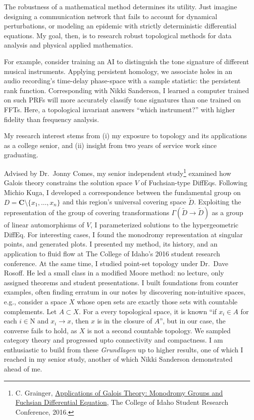 The robustness of a mathematical method determines its utility. Just
imagine designing a communication network that fails to account for
dynamical perturbations, or modeling an epidemic with strictly
deterministic differential equations. My goal, then, is to research
robust topological methods for data analysis and physical applied
mathematics.

For example, consider training an AI to distinguish the tone signature
of different musical instruments. Applying persistent homology, we
associate holes in an audio recording's time-delay phase-space with a
sample statistic: the persistent rank function. Corresponding with Nikki
Sanderson, I learned a computer trained on such PRFs will more
accurately classify tone signatures than one trained on FFTs. Here, a
topological invariant answers ``which instrument?'' with higher fidelity
than frequency analysis.

My research interest stems from (i) my exposure to topology and its
applications as a college senior, and (ii) insight from two years of
service work since graduating.

Advised by Dr.~Jonny Comes, my senior independent study\footnote{C.
  Grainger,
  \href{http://coltongrainger.com/documents/cgrainger_coursework_galois_poster.pdf}{Applications
  of Galois Theory: Monodromy Groups and Fuchsian Differential
  Equation}, The College of Idaho Student Research Conference, 2016.}
examined how Galois theory constrains the solution space \(V\) of
Fuchsian-type DiffEqs. Following Michio Kuga, I developed a
correspondence between the fundamental group on
\(D = \mathbf{C}\setminus\{x_1,\ldots,x_n\}\) and this region's
universal covering space \(\tilde{D}\). Exploiting the representation of
the group of covering transformations
\(\Gamma(\tilde{D} \to \tilde{D})\) as a group of linear automorphisms
of \(V\), I parameterized solutions to the hypergeometric DiffEq. For
interesting cases, I found the monodromy representation at singular
points, and generated plots. I presented my method, its history, and an
application to fluid flow at The College of Idaho's 2016 student
research conference. At the same time, I studied point-set topology
under Dr.~Dave Rosoff. He led a small class in a modified Moore method:
no lecture, only assigned theorems and student presentations. I built
foundations from counter examples, often finding erratum in our notes by
discovering non-intuitive spaces, e.g., consider a space \(X\) whose
open sets are exactly those sets with countable complements. Let
\(A \subset X\). For a every topological space, it is known ``if
\(x_i \in A\) for each \(i \in \mathrm{N}\) and \(x_i \to x\), then
\(x\) is in the closure of \(A\)'', but in our case, the converse fails
to hold, as \(X\) is not a second countable topology. We sampled
category theory and progressed upto connectivity and compactness. I am
enthusiastic to build from these \emph{Grundlagen} up to higher results,
one of which I reached in my senior study, another of which Nikki
Sanderson demonstrated ahead of me.

